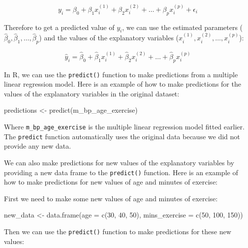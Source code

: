 \documentclass[
  letterpaper,
  8pt,
  a4paper]{book}
\newenvironment{Shaded}{\begin{snugshade}}{\end{snugshade}}
\newcommand{\AttributeTok}[1]{\textcolor[rgb]{0.40,0.45,0.13}{#1}}
\newcommand{\DecValTok}[1]{\textcolor[rgb]{0.68,0.00,0.00}{#1}}
\newcommand{\FunctionTok}[1]{\textcolor[rgb]{0.28,0.35,0.67}{#1}}
\newcommand{\NormalTok}[1]{\textcolor[rgb]{0.00,0.23,0.31}{#1}}
\newcommand{\OtherTok}[1]{\textcolor[rgb]{0.00,0.23,0.31}{#1}}
\begin{document}
\[y_i = \beta_0 + \beta_1 x_i^{(1)} + \beta_2 x_i^{(2)} + \ldots + \beta_p x_i^{(p)} + \epsilon_i\]

Therefore to get a predicted value of \(y_i\), we can use the estimated
parameters (\(\hat\beta_0, \hat\beta_1, \ldots, \hat\beta_p\)) and the
values of the explanatory variables
(\(x_i^{(1)}, x_i^{(2)}, \ldots, x_i^{(p)}\)):

\[\hat{y}_i = \hat\beta_0 + \hat\beta_1 x_i^{(1)} + \hat\beta_2 x_i^{(2)} + \ldots + \hat\beta_p x_i^{(p)}\]

In R, we can use the \texttt{predict()} function to make predictions
from a multiple linear regression model. Here is an example of how to
make predictions for the values of the explanatory variables in the
original dataset:

\begin{Shaded}
\begin{Highlighting}[]
\NormalTok{predictions }\OtherTok{\textless{}{-}} \FunctionTok{predict}\NormalTok{(m\_bp\_age\_exercise)}
\end{Highlighting}
\end{Shaded}

Where \texttt{m\_bp\_age\_exercise} is the multiple linear regression
model fitted earlier. The \texttt{predict} function automatically uses
the original data because we did not provide any new data.

We can also make predictions for new values of the explanatory variables
by providing a new data frame to the \texttt{predict()} function. Here
is an example of how to make predictions for new values of age and
minutes of exercise:

First we need to make some new values of age and minutes of exercise:

\begin{Shaded}
\begin{Highlighting}[]
\NormalTok{new\_data }\OtherTok{\textless{}{-}} \FunctionTok{data.frame}\NormalTok{(}\AttributeTok{age =} \FunctionTok{c}\NormalTok{(}\DecValTok{30}\NormalTok{, }\DecValTok{40}\NormalTok{, }\DecValTok{50}\NormalTok{),}
                       \AttributeTok{mins\_exercise =} \FunctionTok{c}\NormalTok{(}\DecValTok{50}\NormalTok{, }\DecValTok{100}\NormalTok{, }\DecValTok{150}\NormalTok{))}
\end{Highlighting}
\end{Shaded}

Then we can use the \texttt{predict()} function to make predictions for
these new values:
\end{document}
